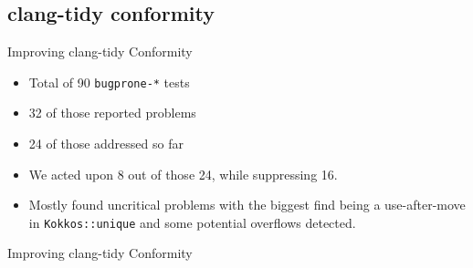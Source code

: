 \subsection{clang-tidy conformity}

\begin{frame}[fragile]{Improving clang-tidy Conformity}
\begin{itemize}
    \item Total of 90 \texttt{bugprone-*} tests
    \item 32 of those reported problems
    \item 24 of those addressed so far
    \item We acted upon 8 out of those 24, while suppressing 16.
    \item Mostly found uncritical problems with the biggest find being a use-after-move in \texttt{Kokkos::unique} and some potential overflows detected.
\end{itemize}
\end{frame}

\begin{frame}[fragile]{Improving clang-tidy Conformity}
\begin{center}
\end{center}
\end{frame}

